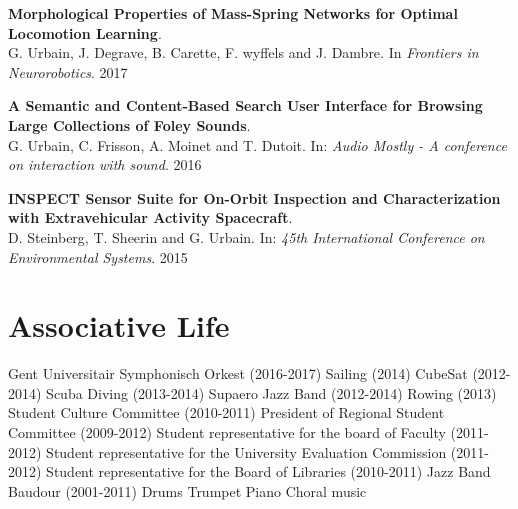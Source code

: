 \documentclass[a4paper]{deedy-resume} %
\begin{document}
\begin{flushleft}
\textbf{Morphological Properties of Mass-Spring Networks for Optimal Locomotion Learning}. \\
G. Urbain, J. Degrave, B. Carette, F. wyffels and J. Dambre. In \textit{Frontiers in Neurorobotics}. 2017

\vspace{5pt}
\textbf{A Semantic and Content-Based Search User Interface for Browsing Large Collections of Foley Sounds}. \\
G. Urbain, C. Frisson, A. Moinet and T. Dutoit. In: \textit{Audio Mostly - A conference on interaction with sound}. 2016

\vspace{5pt}
\textbf{INSPECT Sensor Suite for On-Orbit Inspection and Characterization with Extravehicular Activity Spacecraft}.\\
D. Steinberg, T. Sheerin and G. Urbain. In: \textit{45th International Conference on Environmental Systems}. 2015
\end{flushleft}

\vspace{5pt}



\section{Associative Life}
\vspace{5pt}



\vspace{12pt}



\vspace{12pt}


\location{}
\vspace{3pt}
Gent Universitair Symphonisch Orkest (2016-2017) \textbullet{} Sailing (2014) \textbullet{} CubeSat (2012-2014) \textbullet{} Scuba Diving (2013-2014) \textbullet{} Supaero Jazz Band (2012-2014) \textbullet{} Rowing (2013) \textbullet{} Student Culture Committee (2010-2011) \textbullet{} President of Regional Student Committee (2009-2012) \textbullet{} Student representative for the board of Faculty (2011-2012) \textbullet{} Student representative for the University Evaluation Commission (2011-2012) \textbullet{} Student representative for the Board of Libraries (2010-2011) \textbullet{} Jazz Band Baudour (2001-2011) \textbullet{} Drums \textbullet{} Trumpet \textbullet{} Piano \textbullet{} Choral music
\end{document}
